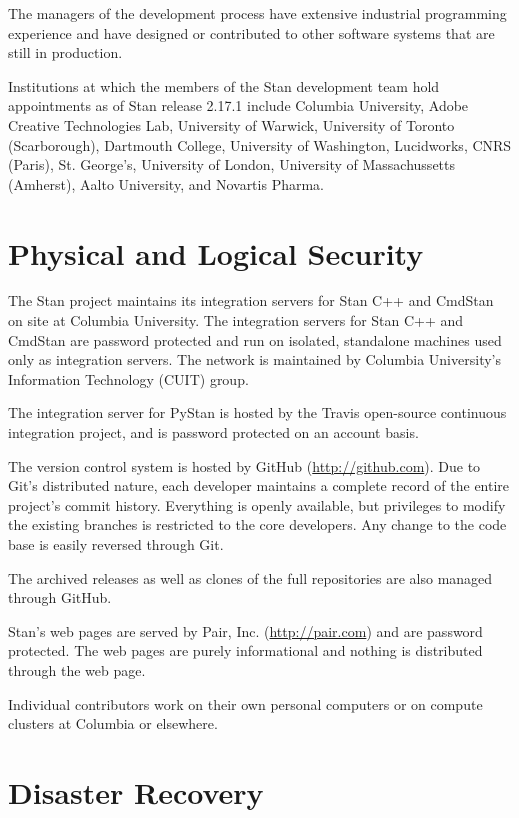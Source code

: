 The managers of the development process have extensive industrial
programming experience and have designed or contributed to other
software systems that are still in production.

Institutions at which the members of the Stan development team hold
appointments as of Stan release 2.17.1 include Columbia University,
Adobe Creative Technologies Lab, University of Warwick, University of
Toronto (Scarborough), Dartmouth College, University of Washington,
Lucidworks, CNRS (Paris), St. George's, University of London,
University of Massachussetts (Amherst), Aalto University, and Novartis
Pharma.

\section{Physical and Logical Security}

The Stan project maintains its integration servers for Stan C++ and
CmdStan on site at Columbia University. The integration servers for
Stan C++ and CmdStan are password protected and run on isolated,
standalone machines used only as integration servers. The network is
maintained by Columbia University's Information Technology (CUIT)
group.

The integration server for PyStan is hosted by the Travis open-source
continuous integration project, and is password protected on an
account basis.

The version control system is hosted by GitHub
(\url{http://github.com}). Due to Git's distributed nature, each
developer maintains a complete record of the entire project's commit
history. Everything is openly available, but privileges to modify the
existing branches is restricted to the core developers. Any change to
the code base is easily reversed through Git.

The archived releases as well as clones of the full repositories are
also managed through GitHub.

Stan's web pages are served by Pair, Inc. (\url{http://pair.com}) and
are password protected.  The web pages are purely informational and
nothing is distributed through the web page.

Individual contributors work on their own personal computers or on
compute clusters at Columbia or elsewhere.


\section{Disaster Recovery}

